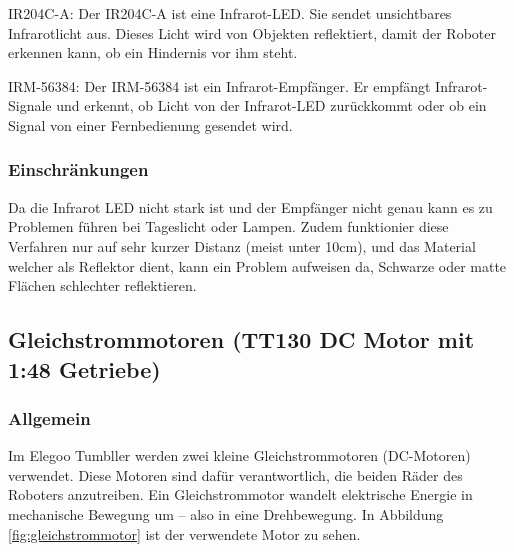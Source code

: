 IR204C-A:
Der IR204C-A ist eine Infrarot-LED.
%
Sie sendet unsichtbares Infrarotlicht aus.
%
Dieses Licht wird von Objekten reflektiert,
damit der Roboter erkennen kann, ob ein Hindernis vor ihm steht.

IRM-56384:
Der IRM-56384 ist ein Infrarot-Empfänger.
%
Er empfängt Infrarot-Signale und erkennt,
ob Licht von der Infrarot-LED zurückkommt oder ob ein Signal von einer Fernbedienung gesendet wird.
\subsubsection{Einschränkungen}
Da die Infrarot LED nicht stark ist und der Empfänger nicht genau kann es zu Problemen führen bei Tageslicht oder Lampen.
%
Zudem funktionier diese Verfahren nur auf sehr kurzer Distanz (meist unter 10cm),
und das Material welcher als Reflektor dient, kann ein Problem aufweisen da,
Schwarze oder matte Flächen schlechter reflektieren.
%
\subsection{Gleichstrommotoren (TT130 DC Motor mit 1:48 Getriebe)}
%
\subsubsection{Allgemein}
Im Elegoo Tumbller werden zwei kleine Gleichstrommotoren (DC-Motoren) verwendet.
%
Diese Motoren sind dafür verantwortlich,
die beiden Räder des Roboters anzutreiben.
%
Ein Gleichstrommotor wandelt elektrische Energie in mechanische Bewegung um -- also in eine Drehbewegung.
%
In Abbildung \ref{fig:gleichstrommotor} ist der verwendete Motor zu sehen.

